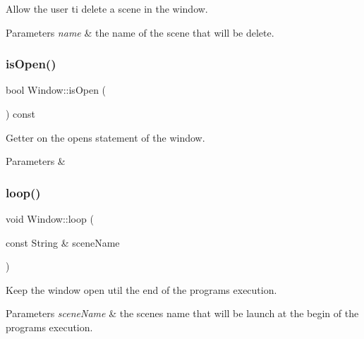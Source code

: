 Allow the user ti delete a scene in the window. 


\begin{DoxyParams}{Parameters}
{\em \textquotesingle{}name\textquotesingle{}} & the name of the scene that will be delete. \\
\hline
\end{DoxyParams}
\mbox{\label{classWindow_a761d614931fb5a5daa70e4f580c3e78e}} 
\subsubsection{\texorpdfstring{is\+Open()}{isOpen()}}
{\footnotesize\ttfamily bool Window\+::is\+Open (\begin{DoxyParamCaption}{ }\end{DoxyParamCaption}) const}



Getter on the open\textquotesingle{}s statement of the window. 


\begin{DoxyParams}{Parameters}
{\em } & \\
\hline
\end{DoxyParams}
\mbox{\label{classWindow_a9c9f1fd6ebc2b93f16ca870487a4a4c6}} 
\subsubsection{\texorpdfstring{loop()}{loop()}}
{\footnotesize\ttfamily void Window\+::loop (\begin{DoxyParamCaption}\item[{const String \&}]{scene\+Name }\end{DoxyParamCaption})}



Keep the window open util the end of the program\textquotesingle{}s execution. 


\begin{DoxyParams}{Parameters}
{\em \textquotesingle{}scene\+Name\textquotesingle{}} & the scene\textquotesingle{}s name that will be launch at the begin of the program\textquotesingle{}s execution. \\
\hline
\end{DoxyParams}
\mbox{\label{classWindow_a9e73c1dc8b22cdf16e6446af6f7ade48}} 
